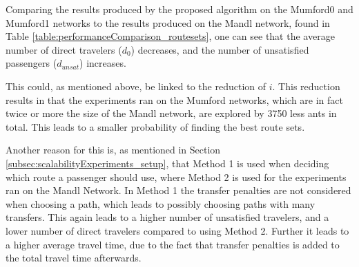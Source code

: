 Comparing the results produced by the proposed algorithm on the Mumford0 and Mumford1 networks to the results produced on the Mandl network, found in Table \vref{table:performanceComparison_routesets}, one can see that the average number of direct travelers ($d_0$) decreases, and the number of unsatisfied passengers ($d_{unsat}$) increases. 

This could, as mentioned above, be linked to the reduction of $i$. This reduction results in that the experiments ran on the Mumford networks, which are in fact twice or more the size of the Mandl network, are explored by 3750 less ants in total. This leads to a smaller probability of finding the best route sets.

Another reason for this is, as mentioned in Section \vref{subsec:scalabilityExperiments_setup}, that Method 1 is used when deciding which route a passenger should use, where Method 2 is used for the experiments ran on the Mandl Network. In Method 1 the transfer penalties are not considered when choosing a path, which leads to possibly choosing paths with many transfers. This again leads to a higher number of unsatisfied travelers, and a lower number of direct travelers compared to using Method 2. Further it leads to a higher average travel time, due to the fact that transfer penalties is added to the total travel time afterwards.


